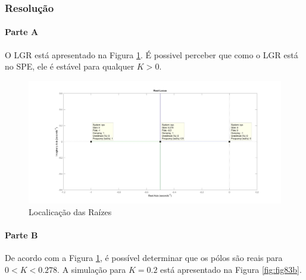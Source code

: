 \documentclass[
]{book}
\theoremstyle{definition}
\theoremstyle{definition}
\theoremstyle{definition}
\theoremstyle{remark}
\begin{document}
\hypertarget{resoluuxe7uxe3o-24}{%
\subsubsection*{Resolução}\label{resoluuxe7uxe3o-24}}

\hypertarget{parte-a-11}{%
\paragraph{Parte A}\label{parte-a-11}}

O LGR está apresentado na Figura \ref{fig:fig8R5}. É possivel perceber que como o LGR está no SPE, ele é estável para qualquer \(K > 0\).

\begin{figure}

{\centering \includegraphics{Imagens/Lab8/Resolução/fig5} 

}

\caption{Localicação das Raízes}\label{fig:fig8R5}
\end{figure}

\hypertarget{parte-b-11}{%
\paragraph{Parte B}\label{parte-b-11}}

De acordo com a Figura \ref{fig:fig8R5}, é possível determinar que os pólos são reais para \(0 < K < 0.278\). A simulação para \(K = 0.2\) está apresentado na Figura \ref{fig:fig83b}.
\end{document}
